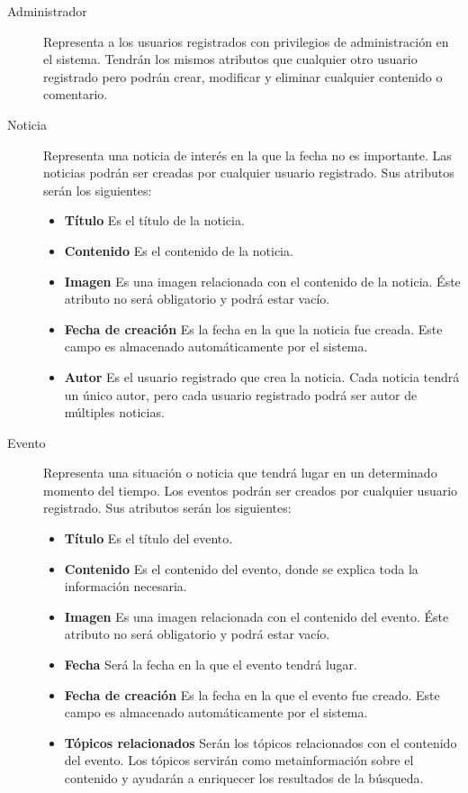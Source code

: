 \begin{description}
\item[Administrador]  Representa a los usuarios registrados con privilegios de administración en el sistema.  Tendrán los mismos atributos que cualquier otro usuario registrado pero podrán crear, modificar y eliminar cualquier contenido o comentario.
\item[Noticia]  Representa una noticia de interés en la que la fecha no es importante.  Las noticias podrán ser creadas por cualquier usuario registrado.  Sus atributos serán los siguientes:
							\begin{itemize}
							\item \textbf{Título}  Es el título de la noticia.
							\item \textbf{Contenido}  Es el contenido de la noticia.
							\item \textbf{Imagen}  Es una imagen relacionada con el contenido de la noticia.  Éste atributo no será obligatorio y podrá estar vacío.
							\item \textbf{Fecha de creación}  Es la fecha en la que la noticia fue creada.  Este campo es almacenado automáticamente por el sistema.
							\item \textbf{Autor}  Es el usuario registrado que crea la noticia.  Cada noticia tendrá un único autor, pero cada usuario registrado podrá ser autor de múltiples noticias.
							\end{itemize}
\item[Evento]  Representa una situación o noticia que tendrá lugar en un determinado momento del tiempo.  Los eventos podrán ser creados por cualquier usuario registrado.  Sus atributos serán los siguientes:
							\begin{itemize}
							\item \textbf{Título}  Es el título del evento.
							\item \textbf{Contenido}  Es el contenido del evento, donde se explica toda la información necesaria.
							\item \textbf{Imagen}  Es una imagen relacionada con el contenido del evento.  Éste atributo no será obligatorio y podrá estar vacío.
							\item \textbf{Fecha}  Será la fecha en la que el evento tendrá lugar.
							\item \textbf{Fecha de creación}  Es la fecha en la que el evento fue creado.  Este campo es almacenado automáticamente por el sistema.
							\item \textbf{Tópicos relacionados}  Serán los tópicos relacionados con el contenido del evento.  Los tópicos servirán como metainformación sobre el contenido y ayudarán a enriquecer los resultados de la búsqueda.

\end{itemize}
\end{description}
